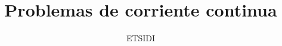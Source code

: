 \documentclass[a4paper,11pt]{article}
\title{Problemas de corriente continua}
\date{}
\author{ETSIDI}
\begin{document}
\maketitle


\section{} 



\subsection{}


\newpage




\end{document}
